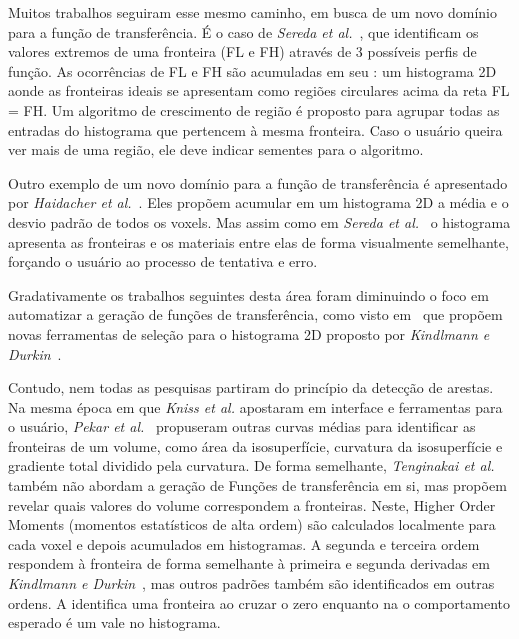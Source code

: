 	Muitos trabalhos seguiram esse mesmo caminho, em busca de um novo domínio para a função de transferência. É o caso de \textit{Sereda et al.}~\cite{sereda1}, que identificam os valores extremos de uma fronteira (FL e FH) através de 3 possíveis perfis de função. As ocorrências de FL e FH são acumuladas em seu : um histograma 2D aonde as fronteiras ideais se apresentam como regiões circulares acima da reta FL = FH. Um algoritmo de crescimento de região é proposto para agrupar todas as entradas do histograma que pertencem à mesma fronteira. Caso o usuário queira ver mais de uma região, ele deve indicar sementes para o algoritmo.
	
	Outro exemplo de um novo domínio para a função de transferência é apresentado por \textit{Haidacher et al.}~\cite{haidacher}. Eles propõem acumular em um histograma 2D a média e o desvio padrão de todos os voxels. Mas assim como em \textit{Sereda et al.}~\cite{sereda1} o histograma apresenta as fronteiras e os materiais entre elas de forma visualmente semelhante, forçando o usuário ao processo de tentativa e erro.
	
	Gradativamente os trabalhos seguintes desta área foram diminuindo o foco em automatizar a geração de funções de transferência, como visto em~\cite{zou, wang} que propõem novas ferramentas de seleção para o histograma 2D proposto por \textit{Kindlmann e Durkin}~\cite{gordon}.
	
	Contudo, nem todas as pesquisas partiram do princípio da detecção de arestas. Na mesma época em que \textit{Kniss et al.} apostaram em interface e ferramentas para o usuário, \textit{Pekar et al.}~\cite{pekar} propuseram outras curvas médias para identificar as fronteiras de um volume, como área da isosuperfície, curvatura da isosuperfície e gradiente total dividido pela curvatura. De forma semelhante, \textit{Tenginakai et al.}~\cite{salient} também não abordam a geração de Funções de transferência em si, mas propõem revelar quais valores do volume correspondem a fronteiras. Neste, Higher Order Moments (momentos estatísticos de alta ordem) são calculados localmente para cada voxel e depois acumulados em histogramas. A segunda e terceira ordem respondem à fronteira de forma semelhante à primeira e segunda derivadas em \textit{Kindlmann e Durkin}~\cite{gordon}, mas outros padrões também são identificados em outras ordens. A  identifica uma fronteira ao cruzar o zero enquanto na  o comportamento esperado é um vale no histograma.
	
